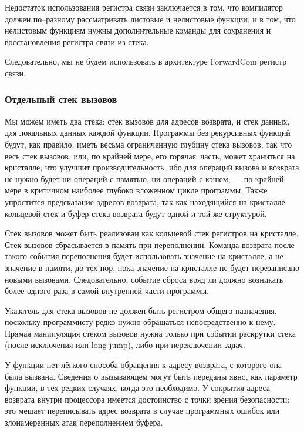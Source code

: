 \documentclass[forwardcom.tex]{subfiles}
\begin{document}
Недостаток использования регистра связи заключается в том, что компилятор должен по--разному рассматривать листовые и нелистовые функции, и в том, что нелистовым функциям  нужны дополнительные команды для сохранения и восстановления регистра связи из стека.

Следовательно, мы не будем использовать в архитектуре ForwardCom регистр связи.

\subsubsection{Отдельный стек вызовов} \label{dualStack}
Мы можем иметь два стека: стек вызовов для адресов возврата, и стек данных, для локальных данных каждой функции. Программы без рекурсивных функций будут, как правило, иметь весьма ограниченную глубину стека вызовов, так что весь стек вызовов, или, по крайней мере, его \glqq горячая\grqq\ часть, может храниться на кристалле, что улучшит производительность, ибо для операций вызова и возврата не нужно будет ни операций с памятью, ни операций с кэшем, --- по крайней мере в критичном наиболее глубоко вложенном цикле программы. Также упростится предсказание адресов возврата, так как находящийся на кристалле кольцевой стек и буфер стека возврата будут одной и той же структурой.

Стек вызовов может быть реализован как кольцевой стек регистров на кристалле. Стек вызовов сбрасывается в память при переполнении. Команда возврата после такого события переполнения будет использовать значение на кристалле, а не значение в памяти, до тех пор, пока значение на кристалле не будет перезаписано новыми вызовами. Следовательно, событие сброса вряд ли должно возникать более одного раза в самой внутренней части программы.

Указатель для стека вызовов не должен быть регистром общего назначения, поскольку программисту редко нужно обращаться непосредственно к нему. Прямая манипуляция стеком вызовов нужна только при событии раскрутки стека (после исключения или long jump), либо при переключении задач.

У функции нет лёгкого способа обращения к адресу возврата, с которого она была вызвана. Сведения о вызывающем могут быть переданы явно, как параметр функции, в тех редких случаях, когда это необходимо. У сокрытия адреса возврата внутри процессора имеется достоинство с точки зрения безопасности: это мешает переписывать адрес возврата в случае программных ошибок или злонамеренных атак переполнением буфера.
\end{document}
